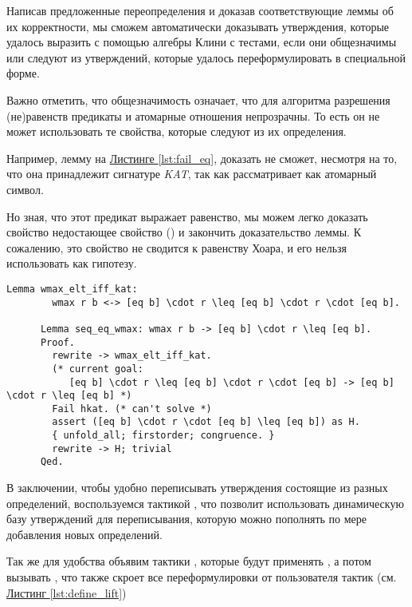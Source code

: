 \documentclass[times
              ,specification
              ,annotation
              ]{itmo-student-thesis}
\begin{document}
      Написав предложенные переопределения и доказав соответствующие леммы об их корректности, мы сможем
      автоматически доказывать утверждения, которые удалось выразить с помощью
      алгебры Клини с тестами, если они общезначимы или следуют из утверждений, которые удалось
      переформулировать в специальной форме.

      Важно отметить, что общезначимость означает, что для алгоритма разрешения (не)равенств предикаты
      и атомарные отношения непрозрачны. То есть он не может использовать те свойства, которые следуют
      из их определения.

      Например, лемму  на \hyperref[lst:fail_eq]{Листинге \ref{lst:fail_eq}},
       доказать не сможет, несмотря на то, что она принадлежит сигнатуре \textit{KAT}, так
      как рассматривает  как атомарный символ.

      Но зная, что этот предикат  выражает равенство, мы можем легко доказать свойство
      недостающее свойство ()
      и закончить доказательство леммы. К сожалению, это свойство не сводится к равенству Хоара, и его нельзя использовать как гипотезу.
      \begin{lstlisting}[float=!h, gobble=6,
        caption={Пример не возможного использования hkat из-за нехватки гипотезы о внутреннем устройстве
        предиката}, label={lst:fail_eq}]
      Lemma wmax_elt_iff_kat:
        wmax r b <-> [eq b] \cdot r \leq [eq b] \cdot r \cdot [eq b].

      Lemma seq_eq_wmax: wmax r b -> [eq b] \cdot r \leq [eq b].
      Proof.
        rewrite -> wmax_elt_iff_kat.
        (* current goal:
           [eq b] \cdot r \leq [eq b] \cdot r \cdot [eq b] -> [eq b] \cdot r \leq [eq b] *)
        Fail hkat. (* can't solve *)
        assert ([eq b] \cdot r \cdot [eq b] \leq [eq b]) as H.
        { unfold_all; firstorder; congruence. }
        rewrite -> H; trivial
      Qed.
      \end{lstlisting}

      В заключении, чтобы удобно переписывать утверждения состоящие из разных определений, воспользуемся
      тактикой  \cite{coq_man}, что позволит использовать динамическую базу
      утверждений для переписывания, которую можно пополнять по мере добавления новых определений.
    
      Так же для удобства объявим тактики , которые будут применять ,
      а потом вызывать , что также скроет все переформулировки от
      пользователя тактик (см. \hyperref[lst:define_lift]{Листинг \ref{lst:define_lift}})
\end{document}
